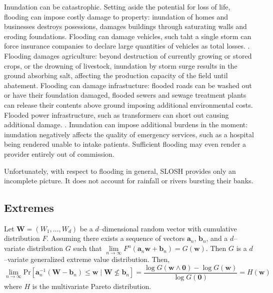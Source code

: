 Inundation can be catastrophic.  Setting aside the potential for loss of life, 
    flooding can impose costly damage to property: inundation of homes and 
    businesses destroys posessions, damages buildings through saturating 
    walls and eroding foundations. \needcite  
    Flooding can damage vehicles, such taht a single storm can force insurance 
    companies to declare large quantities of vehicles as total losses. 
    \needcite.  Flooding damages agriculture: beyond 
    destruction of currently growing or stored crops, or the drowning of 
    livestock, inundation by storm surge results in the ground absorbing salt, 
    affecting the production capacity of the field until abatement. Flooding can
    damage infrastucture: flooded roads can be washed out or have their 
    foundation damaged, flooded sewers and sewage treatment plants can release 
    their contents above ground imposing additional environmental costs.  
    Flooded power infrastructure, such as transformers can short out causing 
    additional damage. \citep{hutchings2021}.  Inundation can impose additional 
    burdens in the moment:  inundation negatively affects the quality of 
    emergency services, such as a hospital being rendered unable to intake 
    patients.  Sufficient flooding may even render a provider entirely out of 
    commission.

Unfortunately, with respect to flooding in general, SLOSH provides only an 
    incomplete picture.  It does not account for rainfall or rivers bursting
    their banks.

\subsection{Extremes}


Let $\bm{W} = (W_1,\ldots,W_d)$ be a $d$--dimensional random vector with 
    cumulative distribution $F$.  Assuming there exists a sequence of vectors
    $\bm{a}_n$, $\bm{b}_n$, and a $d$--variate distribution $G$ such that 
    $\lim\limits_{n\to\infty}F^n(\bm{a}_n\bm{w} + \bm{b}_n) = G(\bm{w})$.  Then
    $G$ is a $d$--variate generalized extreme value distribution.  Then,
    \[
        \lim\limits_{n\to\infty}\text{Pr}
            \left[\bm{a}_n^{-1}(\bm{W} - \bm{b}_n) 
                \leq \bm{w}\mid \bm{W}\not\leq \bm{b}_n\right]
        = \frac{\log G(\bm{w}\wedge \bm{0}) - \log G(\bm{w})}{\log G(\bm{0})}
        = H(\bm{w})
    \]
    where $H$ is the multivariate Pareto distribution.




